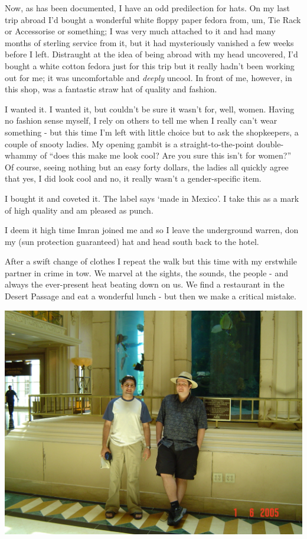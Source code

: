 \documentclass[a5paper,titlepage,11pt]{book}
\begin{document}
Now, as has been documented, I have an odd predilection for hats.  On my last trip abroad I'd bought a wonderful white floppy paper fedora from, um, Tie Rack or Accessorise or something; I was very much attached to it and had many months of sterling service from it, but it had mysteriously vanished a few weeks before I left.  Distraught at the idea of being abroad with my head uncovered, I'd bought a white cotton fedora just for this trip but it really hadn't been working out for me; it was uncomfortable and \emph{deeply} uncool.  In front of me, however, in this shop, was a fantastic straw hat of quality and fashion.

I wanted it.  I wanted it, but couldn't be sure it wasn't for, well, women.  Having no fashion sense myself, I rely on others to tell me when I really can't wear something - but this time I'm left with little choice but to ask the shopkeepers, a couple of snooty ladies.  My opening gambit is a straight-to-the-point double-whammy of ``does this make me look cool?  Are you sure this isn't for women?''  Of course, seeing nothing but an easy forty dollars, the ladies all quickly agree that yes, I did look cool and no, it really wasn't a gender-specific item.

I bought it and coveted it.  The label says `made in Mexico'.  I take this as a mark of high quality and am pleased as punch.

I deem it high time Imran joined me and so I leave the underground warren, don my (sun protection guaranteed) hat and head south back to the hotel.

After a swift change of clothes I repeat the walk but this time with my erstwhile partner in crime in tow.  We marvel at the sights, the sounds, the people - and always the ever-present heat beating down on us.  We find a restaurant in the Desert Passage and eat a wonderful lunch - but then we make a critical mistake.

\begin{center}\includegraphics[width=\textwidth]{gfx/DSC00685}\end{center}
\end{document}
